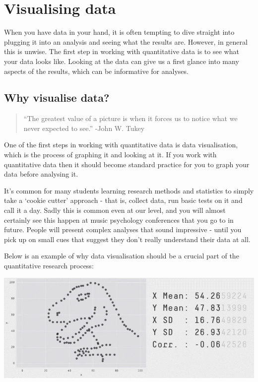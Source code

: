\documentclass[
]{book}
\begin{document}
\section{Visualising data}\label{visualising-data}

When you have data in your hand, it is often tempting to dive straight into plugging it into an analysis and seeing what the results are. However, in general this is unwise. The first step in working with quantitative data is to see what your data looks like. Looking at the data can give us a first glance into many aspects of the results, which can be informative for analyses.

\subsection{Why visualise data?}\label{why-visualise-data}

\begin{quote}
``The greatest value of a picture is when it forces us to notice what we never expected to see.'' -John W. Tukey
\end{quote}

One of the first steps in working with quantitative data is data visualisation, which is the process of graphing it and looking at it. If you work with quantitative data then it should become standard practice for you to graph your data before analysing it.

It's common for many students learning research methods and statistics to simply take a `cookie cutter' approach - that is, collect data, run basic tests on it and call it a day. Sadly this is common even at our level, and you will almost certainly see this happen at music psychology conferences that you go to in future. People will present complex analyses that sound impressive - until you pick up on small cues that suggest they don't really understand their data at all.

Below is an example of why data visualisation should be a crucial part of the quantitative research process:

\includegraphics{img/datasaurus.gif}
\end{document}
